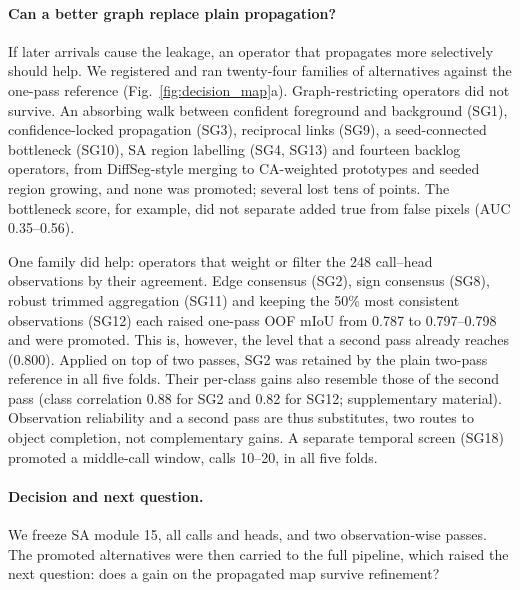 \paragraph{Can a better graph replace plain propagation?}
If later arrivals cause the leakage, an operator that propagates more selectively should help. We registered and ran twenty-four families of alternatives against the one-pass reference (Fig.~\ref{fig:decision_map}a). Graph-restricting operators did not survive. An absorbing walk between confident foreground and background (SG1), confidence-locked propagation (SG3), reciprocal links (SG9), a seed-connected bottleneck (SG10), SA region labelling (SG4, SG13) and fourteen backlog operators, from DiffSeg-style merging to CA-weighted prototypes and seeded region growing, and none was promoted; several lost tens of points. The bottleneck score, for example, did not separate added true from false pixels (AUC 0.35--0.56).

One family did help: operators that weight or filter the 248 call--head observations by their agreement. Edge consensus (SG2), sign consensus (SG8), robust trimmed aggregation (SG11) and keeping the 50\% most consistent observations (SG12) each raised one-pass OOF mIoU from 0.787 to 0.797--0.798 and were promoted. This is, however, the level that a second pass already reaches (0.800). Applied on top of two passes, SG2 was retained by the plain two-pass reference in all five folds. Their per-class gains also resemble those of the second pass (class correlation 0.88 for SG2 and 0.82 for SG12; supplementary material). Observation reliability and a second pass are thus substitutes, two routes to object completion, not complementary gains. A separate temporal screen (SG18) promoted a middle-call window, calls 10--20, in all five folds.

\paragraph{Decision and next question.}
We freeze SA module 15, all calls and heads, and two observation-wise passes. The promoted alternatives were then carried to the full pipeline, which raised the next question: does a gain on the propagated map survive refinement?


